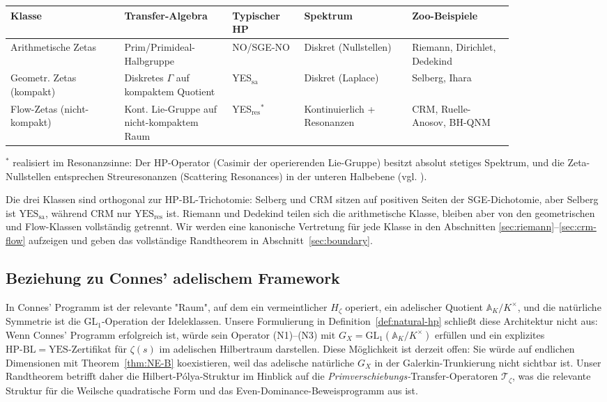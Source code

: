 \documentclass[11pt]{article}
\theoremstyle{definition}
\theoremstyle{remark}
\newcommand{\HBL}{\mathrm{HP\text{-}BL}}
\begin{document}
\begin{center}
\small
\setlength{\tabcolsep}{3pt}
\renewcommand{\arraystretch}{1.18}
\begin{tabular}{@{}p{0.19\linewidth} p{0.18\linewidth} p{0.12\linewidth} p{0.18\linewidth} p{0.17\linewidth}@{}}
\toprule
\textbf{Klasse} & \textbf{Transfer-Algebra} & \textbf{Typischer HP} & \textbf{Spektrum} & \textbf{Zoo-Beispiele} \\
\midrule
Arithmetische Zetas & Prim/Primideal-Halbgruppe & NO/SGE-NO & Diskret (Nullstellen) & Riemann, Dirichlet, Dedekind \\
Geometr. Zetas (kompakt) & Diskretes $\Gamma$ auf kompaktem Quotient & YES$_{\mathrm{sa}}$ & Diskret (Laplace) & Selberg, Ihara \\
Flow-Zetas (nicht-kompakt) & Kont. Lie-Gruppe auf nicht-kompaktem Raum & YES$_{\mathrm{res}}{}^*$ & Kontinuierlich + Resonanzen & CRM, Ruelle-Anosov, BH-QNM \\
\bottomrule
\end{tabular}
\end{center}
${}^*$ realisiert im Resonanzsinne: Der HP-Operator (Casimir der
operierenden Lie-Gruppe) besitzt absolut stetiges Spektrum, und die Zeta-Nullstellen
entsprechen Streuresonanzen (Scattering Resonances) in der unteren Halbebene (vgl. \cite{DyatlovZworski2019}).

Die drei Klassen sind orthogonal zur $\HBL$-Trichotomie: Selberg und CRM
sitzen auf positiven Seiten der SGE-Dichotomie, aber Selberg ist
$\mathrm{YES}_{\mathrm{sa}}$, während CRM nur
$\mathrm{YES}_{\mathrm{res}}$ ist. Riemann und Dedekind teilen sich die arithmetische Klasse,
bleiben aber von den geometrischen und Flow-Klassen vollständig getrennt. Wir werden eine kanonische
Vertretung für jede Klasse in den Abschnitten \ref{sec:riemann}--\ref{sec:crm-flow} aufzeigen
und geben das vollständige Randtheorem in Abschnitt~\ref{sec:boundary}.

\subsection{Beziehung zu Connes' adelischem Framework}

In Connes' Programm \cite{Connes1999, Connes2026} ist der relevante
"Raum", auf dem ein vermeintlicher $H_\zeta$ operiert, ein adelischer
Quotient $\mathbb{A}_K / K^\times$, und die natürliche Symmetrie ist die
$\mathrm{GL}_1$-Operation der Ideleklassen. Unsere Formulierung in Definition~\ref{def:natural-hp}
schließt diese Architektur nicht aus: Wenn Connes' Programm erfolgreich ist,
würde sein Operator (N1)--(N3) mit $G_X = \mathrm{GL}_1(\mathbb{A}_K/K^\times)$
erfüllen und ein explizites $\HBL = \mathrm{YES}$-Zertifikat für $\zeta(s)$
im adelischen Hilbertraum darstellen. Diese Möglichkeit ist derzeit offen:
Sie würde auf endlichen Dimensionen mit Theorem~\ref{thm:NE-B} koexistieren,
weil das adelische natürliche $G_X$ in der Galerkin-Trunkierung nicht sichtbar ist.
Unser Randtheorem betrifft daher die Hilbert-P\'olya-Struktur im Hinblick auf die
\emph{Primverschiebungs-}Transfer-Operatoren $\mathcal{T}_\zeta$, was die relevante
Struktur für die Weilsche quadratische Form und das Even-Dominance-Beweisprogramm
aus \cite{Geiger2026RHII} ist.
\end{document}
